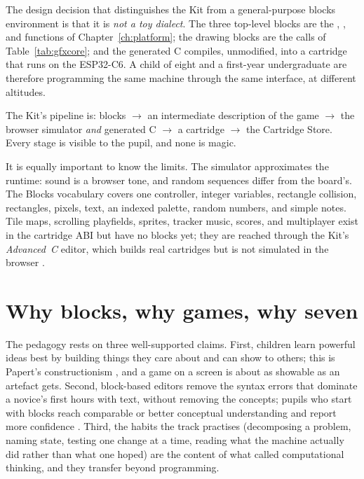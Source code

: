 The design decision that distinguishes the Kit from a general-purpose blocks
environment is that it is \emph{not a toy dialect}. The three top-level blocks
are the , , and  functions of
Chapter~\ref{ch:platform}; the drawing blocks are the calls of
Table~\ref{tab:gfxcore}; and the generated C compiles, unmodified, into a
cartridge that runs on the ESP32\nobreakdash-C6. A child of eight and a
first-year undergraduate are therefore programming the same machine through
the same interface, at different altitudes.

\begin{prgconcept}
The Kit's pipeline is: blocks $\rightarrow$ an intermediate description of the
game $\rightarrow$ the browser simulator \emph{and} generated C $\rightarrow$ a
 cartridge $\rightarrow$ the Cartridge Store. Every stage is
visible to the pupil, and none is magic.
\end{prgconcept}

It is equally important to know the limits. The simulator approximates the
runtime: sound is a browser tone, and random sequences differ from the
board's. The Blocks vocabulary covers one controller, integer variables,
rectangle collision, rectangles, pixels, text, an indexed palette, random
numbers, and simple notes. Tile maps, scrolling playfields, sprites, tracker
music, scores, and multiplayer exist in the cartridge ABI but have no blocks
yet; they are reached through the Kit's \emph{Advanced~C} editor, which builds
real cartridges but is not simulated in the browser \citep{prg32kit}.

\section{Why blocks, why games, why seven}

The pedagogy rests on three well-supported claims. First, children learn
powerful ideas best by building things they care about and can show to others;
this is Papert's constructionism \citep{papert1980}, and a game on a screen is
about as showable as an artefact gets. Second, block-based editors remove the
syntax errors that dominate a novice's first hours with text, without removing
the concepts; pupils who start with blocks reach comparable or better
conceptual understanding and report more confidence \citep{weintrop2017}.
Third, the habits the track practises (decomposing a problem, naming state,
testing one change at a time, reading what the machine actually did rather
than what one hoped) are the content of what \citet{wing2006} called
computational thinking, and they transfer beyond programming.

